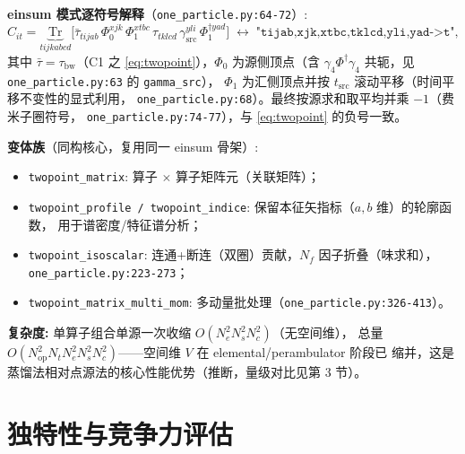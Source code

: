 \documentclass[UTF8]{ctexart}
\begin{document}
\textbf{einsum 模式逐符号解释}（\texttt{one\_particle.py:64-72}）:
\begin{equation}\label{eq:einsum2pt}
C_{it} = \underbrace{\mathrm{Tr}}_{tijkabcd}\Big[
\bar\tau_{tijab}\,\Phi_0^{x jk}\,\Phi_1^{x t b c}\, \tau_{tklcd}\,\gamma_{\text{src}}^{y l i}\,\Phi_1^{\dagger y a d}\Big]
\;\longleftrightarrow\;\texttt{"tijab,xjk,xtbc,tklcd,yli,yad->t"},
\end{equation}
其中 $\bar\tau = \tau_{\mathrm{bw}}$（C1 之 \eqref{eq:twopoint}），$\Phi_0$ 为源侧顶点（含
$\gamma_4\Phi^\dagger\gamma_4$ 共轭，见 \texttt{one\_particle.py:63} 的 \texttt{gamma\_src}），
$\Phi_1$ 为汇侧顶点并按 $t_{\text{src}}$ 滚动平移（时间平移不变性的显式利用，
\texttt{one\_particle.py:68}）。最终按源求和取平均并乘 $-1$（费米子圈符号，
\texttt{one\_particle.py:74-77}），与 \eqref{eq:twopoint} 的负号一致。

\textbf{变体族}（同构核心，复用同一 einsum 骨架）:
\begin{itemize}
\item \texttt{twopoint\_matrix}: 算子 $\times$ 算子矩阵元（关联矩阵）；
\item \texttt{twopoint\_profile / twopoint\_indice}: 保留本征矢指标（$a,b$ 维）的轮廓函数，
  用于谱密度/特征谱分析；
\item \texttt{twopoint\_isoscalar}: 连通+断连（双圈）贡献，$N_f$ 因子折叠（味求和），
  \texttt{\nolinkurl{one_particle.py:223-273}}；
\item \texttt{\nolinkurl{twopoint_matrix_multi_mom}}: 多动量批处理（\texttt{\nolinkurl{one_particle.py:326-413}}）。
\end{itemize}

\textbf{复杂度:} 单算子组合单源一次收缩 $O(N_e^2 N_s^2 N_c^2)$（无空间维），
总量 $O(N_{\text{op}}^2 N_t N_e^2 N_s^2 N_c^2)$——空间维 $V$ 在 elemental/perambulator 阶段已
缩并，这是蒸馏法相对点源法的核心性能优势（推断，量级对比见第 3 节）。

\section{独特性与竞争力评估}
\end{document}
